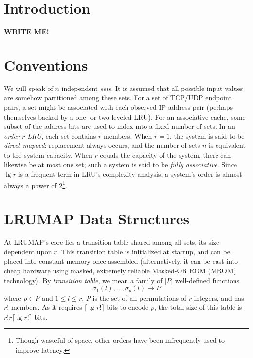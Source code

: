 \documentclass[letterpaper,10pt]{article}
\begin{document}
\begin{multicols}{2}
\section{Introduction}
\textbf{WRITE ME!}
\cite{varghese}
\cite{xu}

\section{Conventions}
We will speak of $n$ independent \textit{sets}. It is assumed that all possible
input values are somehow partitioned among these sets. For a set of TCP/UDP
endpoint pairs, a set might be associated with each observed IP address pair
(perhaps themselves backed by a one- or two-leveled LRU). For an associative
cache, some subset of the address bits are used to index into a fixed number of
sets. In an \textit{order-$r$ LRU}, each set contains $r$ members. When $r=1$,
the system is said to be \textit{direct-mapped}: replacement always occurs, and
the number of sets $n$ is equivalent to the system capacity. When $r$ equals
the capacity of the system, there can likewise be at most one set; such a system
is said to be \textit{fully associative}. Since $\lg{r}$ is a frequent term in
LRU's complexity analysis, a system's order is almost always a power of 2\footnote{Though
wasteful of space, other orders have been infrequently used to improve latency\cite{intelcpuid}.}.
\section{LRUMAP Data Structures}
At LRUMAP's core lies a transition table shared among all sets, its size
dependent upon $r$. This transition table is initialized at startup, and can be
placed into constant memory once assembled (alternatively, it can be cast into
cheap hardware using masked, extremely reliable Masked-OR ROM (MROM)
technology\cite{ice}). By \textit{transition table}, we mean a family of $|P|$
well-defined functions \begin{equation*}
\sigma_{1}(l),\dotsc,\sigma_{p}(l)\longrightarrow{P}
\end{equation*} where $p\in{P}$ and $1\le{l}\le{r}$. $P$ is the set of all
permutations of $r$ integers, and has $r!$ members. As it requires $\lceil\lg{r!}\rceil$
bits to encode $p$, the total size of this table is $r!r\lceil\lg{r!}\rceil$ bits.


\end{multicols}
\end{document}
